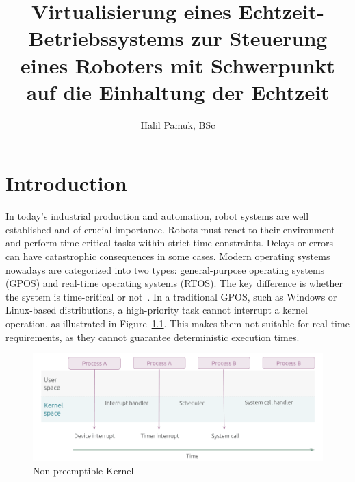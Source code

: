 \documentclass[MMR,Master,english]{twbook}
\title{Virtualisierung eines Echtzeit-Betriebssystems zur Steuerung eines Roboters mit Schwerpunkt auf die
Einhaltung der Echtzeit}
\author{Halil Pamuk, BSc}
\begin{document}
\maketitle
%
%
%



\chapter{Introduction}\label{cha:introduction}
In today's industrial production and automation, robot systems are well established and of crucial importance. Robots must react to their environment and perform time-critical tasks within strict time constraints. Delays or errors can have catastrophic consequences in some cases. Modern operating systems nowadays are categorized into two types:  general-purpose operating systems (GPOS) and real-time operating systems (RTOS). The key difference is whether the system is time-critical or not~\cite{canbazPerformanceAnalysisRealtime2022}. In a traditional GPOS, such as Windows or Linux-based distributions, a high-priority task cannot interrupt a kernel operation, as illustrated in Figure~\ref{fig:kernel_generic}. This makes them not suitable for real-time requirements, as they cannot guarantee deterministic execution times.

\begin{figure}[H]
	\centering
	\includegraphics[width=0.75\columnwidth]{img/introduction/kernel_generic.png}
	\caption[Non-preemptible Kernel]{Non-preemptible Kernel~\cite{WhatRealtimeLinux}}
	\label{fig:kernel_generic}
\end{figure}
\end{document}
